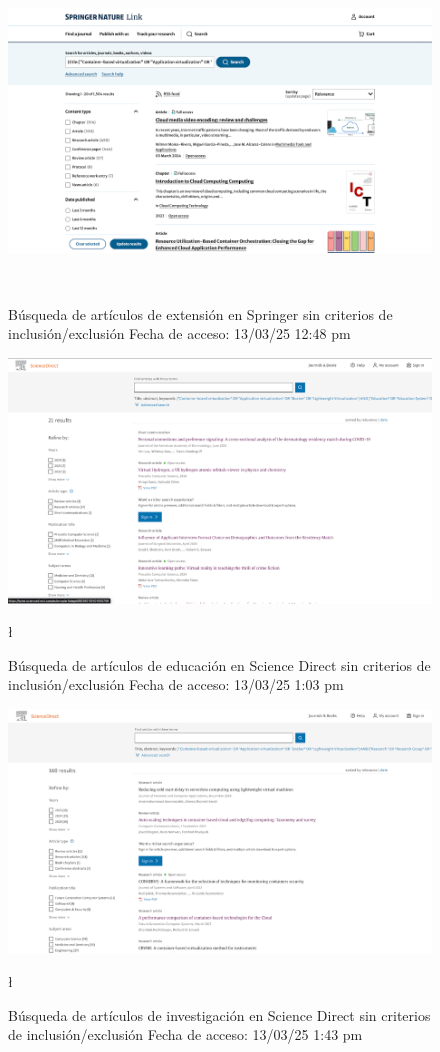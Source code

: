 \FloatBarrier\begin{figure}[H]
    \centering
    \includegraphics[width=\textwidth,keepaspectratio]{apendices/BD/sin-criterios/Springer-ind.png}
    \caption{Búsqueda de artículos de extensión en Springer sin criterios de inclusión/exclusión
    Fecha de acceso: 13/03/25 12:48 pm}\
\end{figure}
\FloatBarrier\begin{figure}[H]
    \centering
    \includegraphics[width=\textwidth,keepaspectratio]{apendices/BD/sin-criterios/SD-ed.png}
    \caption{Búsqueda de artículos de educación en Science Direct sin criterios de inclusión/exclusión
    Fecha de acceso: 13/03/25 1:03 pm}\l
\end{figure}
\FloatBarrier\begin{figure}[H]
    \centering
    \includegraphics[width=\textwidth,keepaspectratio]{apendices/BD/sin-criterios/SD-inv.png}
    \caption{Búsqueda de artículos de investigación en Science Direct sin criterios de inclusión/exclusión
    Fecha de acceso: 13/03/25 1:43 pm}\l
\end{figure}
